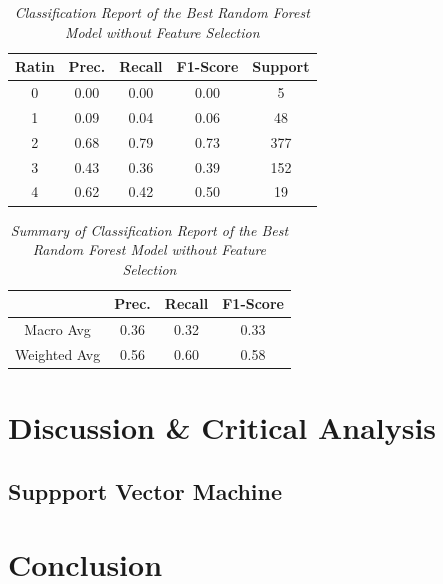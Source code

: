\documentclass[11pt]{article}
\begin{document}
\begin{table}[!ht]
    \begin{center}
        \begin{tabular}{c|c|c|c|c}			
            \hline
            Ratin & Prec. & Recall & F1-Score & Support \\
            \hline\hline
            0 & 0.00 & 0.00 & 0.00 & 5 \\
            1 & 0.09 & 0.04 & 0.06 & 48 \\
            2 & 0.68 & 0.79 & 0.73 & 377 \\
            3 & 0.43 & 0.36 & 0.39 & 152 \\
            4 & 0.62 & 0.42 & 0.50 & 19\\
                \hline
        \end{tabular}

    \caption{\textit{Classification Report of the Best Random Forest Model without Feature Selection}}
        \label{rf-ft-report}

    \end{center}
\end{table}
\begin{table}[!ht]
    \begin{center}
        \begin{tabular}{c||c|c|c}			
            \hline
             & Prec. & Recall & F1-Score \\
            \hline\hline
            Macro Avg & 0.36 & 0.32 & 0.33 \\
            Weighted Avg & 0.56 & 0.60 & 0.58 \\
                \hline
        \end{tabular}

        \caption{\textit{Summary of Classification Report of the Best Random Forest Model without Feature Selection}}
        \label{rf-ft-report-sum}

    \end{center}
\end{table}
\section{Discussion \& Critical Analysis}
\subsection{Suppport Vector Machine}

\section{Conclusion}
\end{document}
